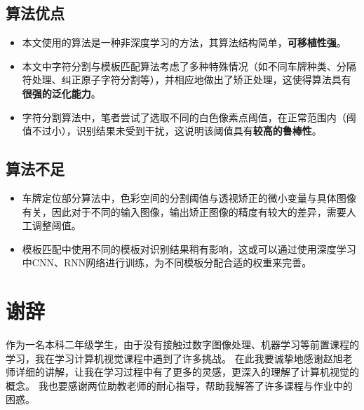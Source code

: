 \documentclass[utf8,a4paper]{ctexart}
\begin{document}
\subsection{算法优点}
\begin{itemize}
    \item 本文使用的算法是一种非深度学习的方法，其算法结构简单，\textbf{可移植性强}。
    \item 本文中字符分割与模板匹配算法考虑了多种特殊情况（如不同车牌种类、分隔符处理、纠正原子字符分割等），并相应地做出了矫正处理，这使得算法具有\textbf{很强的泛化能力}。
    \item 字符分割算法中，笔者尝试了选取不同的白色像素点阈值，在正常范围内（阈值不过小），识别结果未受到干扰，这说明该阈值具有\textbf{较高的鲁棒性}。
\end{itemize}

\subsection{算法不足}
\begin{itemize}
    \item 车牌定位部分算法中，色彩空间的分割阈值与透视矫正的微小变量与具体图像有关，因此对于不同的输入图像，输出矫正图像的精度有较大的差异，需要人工调整阈值。
    \item 模板匹配中使用不同的模板对识别结果稍有影响，这或可以通过使用深度学习中CNN、RNN网络进行训练，为不同模板分配合适的权重来完善。
\end{itemize}

\section{谢辞}
作为一名本科二年级学生，由于没有接触过数字图像处理、机器学习等前置课程的学习，我在学习计算机视觉课程中遇到了许多挑战。
在此我要诚挚地感谢赵旭老师详细的讲解，让我在学习过程中有了更多的灵感，更深入的理解了计算机视觉的概念。
我也要感谢两位助教老师的耐心指导，帮助我解答了许多课程与作业中的困惑。

\newpage
\end{document}
